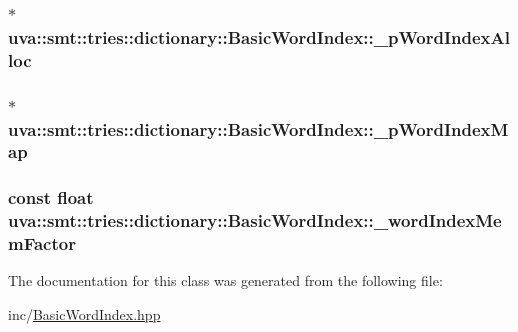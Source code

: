 \subsubsection[{\+\_\+p\+Word\+Index\+Alloc}]{$\ast$ uva\+::smt\+::tries\+::dictionary\+::\+Basic\+Word\+Index\+::\+\_\+p\+Word\+Index\+Alloc\hspace{0.3cm}{\ttfamily [protected]}}\label{classuva_1_1smt_1_1tries_1_1dictionary_1_1_basic_word_index_a466c8ca9da06fd8c6640f20b77ca5b8a}
\hypertarget{classuva_1_1smt_1_1tries_1_1dictionary_1_1_basic_word_index_a549d0686e0530922a7261e33a0cdfd20}{}
\subsubsection[{\+\_\+p\+Word\+Index\+Map}]{$\ast$ uva\+::smt\+::tries\+::dictionary\+::\+Basic\+Word\+Index\+::\+\_\+p\+Word\+Index\+Map\hspace{0.3cm}{\ttfamily [protected]}}\label{classuva_1_1smt_1_1tries_1_1dictionary_1_1_basic_word_index_a549d0686e0530922a7261e33a0cdfd20}
\hypertarget{classuva_1_1smt_1_1tries_1_1dictionary_1_1_basic_word_index_a4efb17e8e41fbd432db6e0472df193ad}{}
\subsubsection[{\+\_\+word\+Index\+Mem\+Factor}]{\setlength{\rightskip}{0pt plus 5cm}const float uva\+::smt\+::tries\+::dictionary\+::\+Basic\+Word\+Index\+::\+\_\+word\+Index\+Mem\+Factor\hspace{0.3cm}{\ttfamily [protected]}}\label{classuva_1_1smt_1_1tries_1_1dictionary_1_1_basic_word_index_a4efb17e8e41fbd432db6e0472df193ad}


The documentation for this class was generated from the following file\+:\begin{DoxyCompactItemize}
\item 
inc/\hyperlink{_basic_word_index_8hpp}{Basic\+Word\+Index.\+hpp}\end{DoxyCompactItemize}
